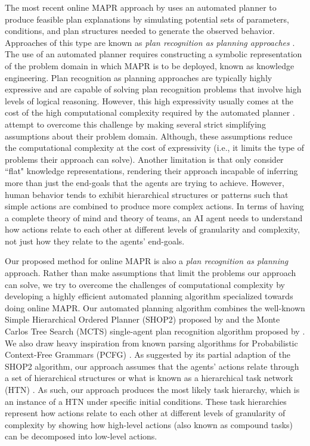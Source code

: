 The most recent online MAPR approach by \citet{Argenta_Doyle_2017} uses an automated planner to produce feasible plan explanations by simulating potential sets of parameters, conditions, and plan structures needed to generate the observed behavior. Approaches of this type are known as \textit{plan recognition as planning approaches} \citep{Ramirez_Geffner_2009,Van-Horenbeke_Peer_2021}. The use of an automated planner requires constructing a symbolic representation of the problem domain in which MAPR is to be deployed, known as knowledge engineering. Plan recognition as planning approaches are typically highly expressive and are capable of solving plan recognition problems that involve high levels of logical reasoning. However, this high expressivity usually comes at the cost of the high computational complexity required by the automated planner \citep{Van-Horenbeke_Peer_2021}. \citet{Argenta_Doyle_2017} attempt to overcome this challenge by making several strict simplifying assumptions about their problem domain. Although, these assumptions reduce the computational complexity at the cost of expressivity (i.e., it limits the type of problems their approach can solve). Another limitation is that \citet{Argenta_Doyle_2017} only consider ``flat" knowledge representations, rendering their approach incapable of inferring more than just the end-goals that the agents are trying to achieve. However, human behavior tends to exhibit hierarchical structures or patterns such that simple actions are combined to produce more complex actions. In terms of having a complete theory of mind and theory of teams, an AI agent needs to understand how actions relate to each other at different levels of granularity and complexity, not just how they relate to the agents' end-goals. 

Our proposed method for online MAPR is also a \textit{plan recognition as planning} approach. Rather than make assumptions that limit the problems our approach can solve, we try to overcome the challenges of computational complexity by developing a highly efficient automated planning algorithm specialized towards doing online MAPR. Our automated planning algorithm combines the well-known Simple Hierarchical Ordered Planner (SHOP2) proposed by \citet{Nau_2003} and the Monte Carlos Tree Search (MCTS) single-agent plan recognition algorithm proposed by \citet{Kantharaju_Ontanon_Geib_2019}. We also draw heavy inspiration from known parsing algorithms for Probabilistic Context-Free Grammars (PCFG) \citep{Collins_2011}. As suggested by its partial adaption of the SHOP2 algorithm, our approach assumes that the agents' actions relate through a set of hierarchical structures or what is known as a hierarchical task network (HTN) \citep{Nau_2003,Russell_Norvig_2021}. As such, our approach produces the most likely task hierarchy, which is an instance of a HTN under specific initial conditions. These task hierarchies represent how actions relate to each other at different levels of granularity of complexity by showing how high-level actions (also known as compound tasks) can be decomposed into low-level actions. 

